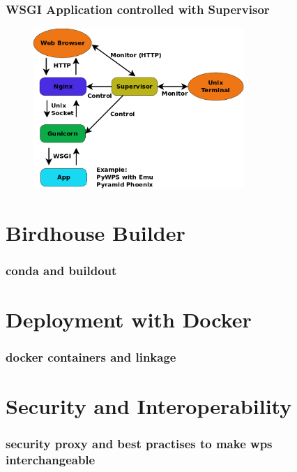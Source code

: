 \documentclass{beamer}
\begin{document}
  \begin{frame}
    \frametitle{WSGI Application controlled with Supervisor}
     \begin{figure}
      \includegraphics[width=8cm]{images/WsgiApp.png}
    \end{figure}
  \end{frame}

  \section{Birdhouse Builder}

  \begin{frame}
    \frametitle{conda and buildout}
  \end{frame}


  \section{Deployment with Docker}

  \begin{frame}
    \frametitle{docker containers and linkage}
  \end{frame}


  \section{Security and Interoperability}

  \begin{frame}
    \frametitle{security proxy and best practises to make wps interchangeable}
  \end{frame}
\end{document}

